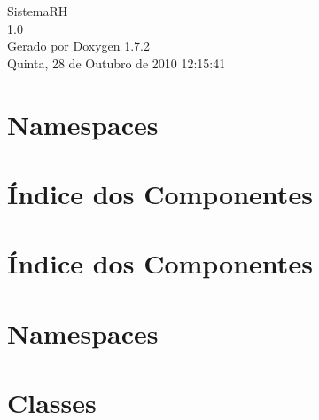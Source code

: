 \documentclass[a4paper]{book}
\begin{document}
\hypersetup{pageanchor=false}
\begin{titlepage}
\vspace*{7cm}
\begin{center}
{\Large SistemaRH \\[1ex]\large 1.0 }\\
\vspace*{1cm}
{\large Gerado por Doxygen 1.7.2}\\
\vspace*{0.5cm}
{\small Quinta, 28 de Outubro de 2010 12:15:41}\\
\end{center}
\end{titlepage}
\clearemptydoublepage
{}
\tableofcontents
\clearemptydoublepage
{}
\hypersetup{pageanchor=true}
\chapter{Namespaces}

\chapter{Índice dos Componentes}

\chapter{Índice dos Componentes}

\chapter{Namespaces}

\chapter{Classes}
































\printindex
\end{document}
